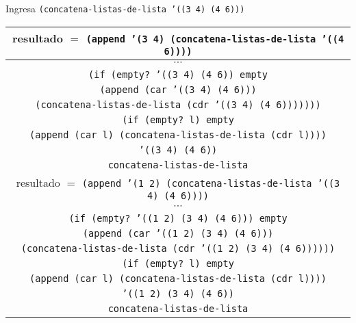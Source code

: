 \documentclass[letterpaper,11pt]{article}
\begin{document}
\begin{enumerate}
\begin{enumerate}
        Ingresa \texttt{(concatena-listas-de-lista '((3 4) (4 6)))}
        \begin{center}
            \begin{tabular}{|c|}
                \hline
                resultado $=$ \texttt{(append '(3 4) 
                (concatena-listas-de-lista '((4 6))))}  \\
                \hline
                $\cdots$ \\
                \hline
                \texttt{(if (empty? '((3 4) (4 6)) empty} \\
                \texttt{(append (car '((3 4) (4 6)))} \\ 
                \texttt{(concatena-listas-de-lista (cdr '((3 4) (4 6)))))))} \\
                \hline
                \texttt{(if (empty? l) empty} \\
                \texttt{(append (car l) (concatena-listas-de-lista (cdr l))))} \\
                \hline
                \texttt{'((3 4) (4 6))} \\
                \hline
                \texttt{concatena-listas-de-lista} \\
                \hline
                \hline
                resultado $=$ \texttt{(append '(1 2) 
                (concatena-listas-de-lista '((3 4) (4 6))))}  \\
                \hline
                $\cdots$ \\
                \hline
                \texttt{(if (empty? '((1 2) (3 4) (4 6))) empty} \\
                \texttt{(append (car '((1 2) (3 4) (4 6)))} \\
                \texttt{(concatena-listas-de-lista 
                (cdr '((1 2) (3 4) (4 6))))))} \\
                \hline
                \texttt{(if (empty? l) empty} \\
                \texttt{(append (car l) (concatena-listas-de-lista (cdr l))))} \\
                \hline
                \texttt{'((1 2) (3 4) (4 6))} \\
                \hline
                \texttt{concatena-listas-de-lista} \\
                \hline
            \end{tabular}
        \end{center}


\end{enumerate}
\end{enumerate}
\end{document}
